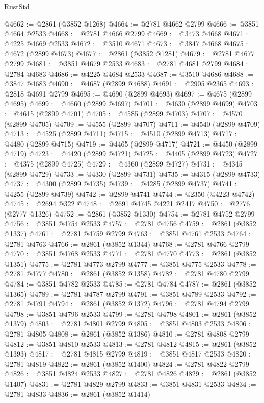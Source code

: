 \begin{lexlean}{RustStd}
\begin{coremodule}
@4662 := @2861 (@3852 @1268)
@4664 := @2781 @4662 @2799
@4666 := @3851 @4664 @2533
@4668 := @2781 @4666 @2799
@4669 := @3473 @4668
@4671 := @4225 @4669 @2533
@4672 := @3510 @4671
@4673 := @3847 @4668
@4675 := @4672 (@2899 @4673)
@4677 := @2861 (@3852 @1281)
@4679 := @2781 @4677 @2799
@4681 := @3851 @4679 @2533
@4683 := @2781 @4681 @2799
@4684 := @2784 @4683
@4686 := @4225 @4684 @2533
@4687 := @3510 @4686
@4688 := @3847 @4683
@4690 := @4687 (@2899 @4688)
@4691 := @2905 @2365
@4693 := @2818 @4691 @2799
@4695 := @4690 (@2899 @4693)
@4697 := @4675 (@2899 @4695)
@4699 := @4660 (@2899 @4697)
@4701 := @4630 (@2899 @4699)
@4703 := @4615 (@2899 @4701)
@4705 := @4585 (@2899 @4703)
@4707 := @4570 (@2899 @4705)
@4709 := @4555 (@2899 @4707)
@4711 := @4540 (@2899 @4709)
@4713 := @4525 (@2899 @4711)
@4715 := @4510 (@2899 @4713)
@4717 := @4480 (@2899 @4715)
@4719 := @4465 (@2899 @4717)
@4721 := @4450 (@2899 @4719)
@4723 := @4420 (@2899 @4721)
@4725 := @4405 (@2899 @4723)
@4727 := @4375 (@2899 @4725)
@4729 := @4360 (@2899 @4727)
@4731 := @4345 (@2899 @4729)
@4733 := @4330 (@2899 @4731)
@4735 := @4315 (@2899 @4733)
@4737 := @4300 (@2899 @4735)
@4739 := @4285 (@2899 @4737)
@4741 := @4255 (@2899 @4739)
@4742 := @2899 @4741
@4744 := @2350 (@4223 @4742)
@4745 := @2694 @322
@4748 := @2691 @4745 @4221 @2417
@4750 := @2776 (@2777 @1326)
@4752 := @2861 (@3852 @1330)
@4754 := @2781 @4752 @2799
@4756 := @3851 @4754 @2533
@4757 := @2781 @4756
@4759 := @2861 (@3852 @1337)
@4761 := @2781 @4759 @2799
@4763 := @3851 @4761 @2533
@4764 := @2781 @4763
@4766 := @2861 (@3852 @1344)
@4768 := @2781 @4766 @2799
@4770 := @3851 @4768 @2533
@4771 := @2781 @4770
@4773 := @2861 (@3852 @1351)
@4775 := @2781 @4773 @2799
@4777 := @3851 @4775 @2533
@4778 := @2781 @4777
@4780 := @2861 (@3852 @1358)
@4782 := @2781 @4780 @2799
@4784 := @3851 @4782 @2533
@4785 := @2781 @4784
@4787 := @2861 (@3852 @1365)
@4789 := @2781 @4787 @2799
@4791 := @3851 @4789 @2533
@4792 := @2781 @4791
@4794 := @2861 (@3852 @1372)
@4796 := @2781 @4794 @2799
@4798 := @3851 @4796 @2533
@4799 := @2781 @4798
@4801 := @2861 (@3852 @1379)
@4803 := @2781 @4801 @2799
@4805 := @3851 @4803 @2533
@4806 := @2781 @4805
@4808 := @2861 (@3852 @1386)
@4810 := @2781 @4808 @2799
@4812 := @3851 @4810 @2533
@4813 := @2781 @4812
@4815 := @2861 (@3852 @1393)
@4817 := @2781 @4815 @2799
@4819 := @3851 @4817 @2533
@4820 := @2781 @4819
@4822 := @2861 (@3852 @1400)
@4824 := @2781 @4822 @2799
@4826 := @3851 @4824 @2533
@4827 := @2781 @4826
@4829 := @2861 (@3852 @1407)
@4831 := @2781 @4829 @2799
@4833 := @3851 @4831 @2533
@4834 := @2781 @4833
@4836 := @2861 (@3852 @1414)

\end{coremodule}
\end{lexlean}
